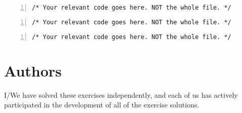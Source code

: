 \documentclass{article}
\begin{document}
\begin{lstlisting}[basicstyle=\small\sffamily,
keywords={break,case,const,continue,default,else,enum,
for,if,return,switch,while,do,long,void,int,float,double,
char,struct,typedef,include,size\_t},
keywordstyle={\color{blue}},
comment={[l]{//}}, morecomment={[s]{/*}{*/}}, commentstyle=\itshape,
columns={[l]flexible}, numbers=left, numberstyle=\tiny,
frameround=fftt, frame=shadowbox, captionpos=b,
caption={Cycle 1: Blocking, deadlock.},
label=LST:cycle1]
/* Your relevant code goes here. NOT the whole file. */
\end{lstlisting}

\begin{lstlisting}[basicstyle=\small\sffamily,
keywords={break,case,const,continue,default,else,enum,
for,if,return,switch,while,do,long,void,int,float,double,
char,struct,typedef,include,size\_t},
keywordstyle={\color{blue}},
comment={[l]{//}}, morecomment={[s]{/*}{*/}}, commentstyle=\itshape,
columns={[l]flexible}, numbers=left, numberstyle=\tiny,
frameround=fftt, frame=shadowbox, captionpos=b,
caption={Cycle 2: Blocking, no deadlock.},
label=LST:cycle2]
/* Your relevant code goes here. NOT the whole file. */
\end{lstlisting}

\begin{lstlisting}[basicstyle=\small\sffamily,
keywords={break,case,const,continue,default,else,enum,
for,if,return,switch,while,do,long,void,int,float,double,
char,struct,typedef,include,size\_t},
keywordstyle={\color{blue}},
comment={[l]{//}}, morecomment={[s]{/*}{*/}}, commentstyle=\itshape,
columns={[l]flexible}, numbers=left, numberstyle=\tiny,
frameround=fftt, frame=shadowbox, captionpos=b,
caption={Cycle 3: Non-blocking, no deadlock.},
label=LST:cycle3]
/* Your relevant code goes here. NOT the whole file. */
\end{lstlisting}



\newpage
\section{Authors}
I/We have solved these exercises independently, and each of us has actively
participated in the development of all of the exercise solutions.
\vspace{1cm}
\end{document}

